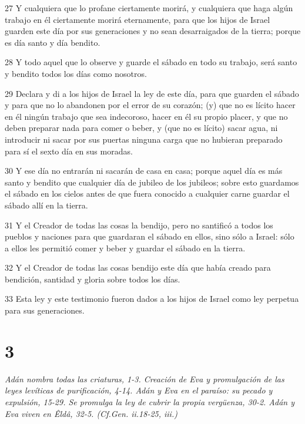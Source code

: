 \par 27 Y cualquiera que lo profane ciertamente morirá, y cualquiera que haga algún trabajo en él ciertamente morirá eternamente, para que los hijos de Israel guarden este día por sus generaciones y no sean desarraigados de la tierra; porque es día santo y día bendito.
\par 28 Y todo aquel que lo observe y guarde el sábado en todo su trabajo, será santo y bendito todos los días como nosotros.
\par 29 Declara y di a los hijos de Israel la ley de este día, para que guarden el sábado y para que no lo abandonen por el error de su corazón; (y) que no es lícito hacer en él ningún trabajo que sea indecoroso, hacer en él su propio placer, y que no deben preparar nada para comer o beber, y (que no es lícito) sacar agua, ni introducir ni sacar por sus puertas ninguna carga que no hubieran preparado para sí el sexto día en sus moradas.
\par 30 Y ese día no entrarán ni sacarán de casa en casa; porque aquel día es más santo y bendito que cualquier día de jubileo de los jubileos; sobre esto guardamos el sábado en los cielos antes de que fuera conocido a cualquier carne guardar el sábado allí en la tierra.
\par 31 Y el Creador de todas las cosas la bendijo, pero no santificó a todos los pueblos y naciones para que guardaran el sábado en ellos, sino sólo a Israel: sólo a ellos les permitió comer y beber y guardar el sábado en la tierra.
\par 32 Y el Creador de todas las cosas bendijo este día que había creado para bendición, santidad y gloria sobre todos los días.
\par 33 Esta ley y este testimonio fueron dados a los hijos de Israel como ley perpetua para sus generaciones.

\chapter{3}

\par \textit{Adán nombra todas las criaturas, 1-3. Creación de Eva y promulgación de las leyes levíticas de purificación, 4-14. Adán y Eva en el paraíso: su pecado y expulsión, 15-29. Se promulga la ley de cubrir la propia vergüenza, 30-2. Adán y Eva viven en Êldâ, 32-5. (Cf.Gen. ii.18-25, iii.)}

